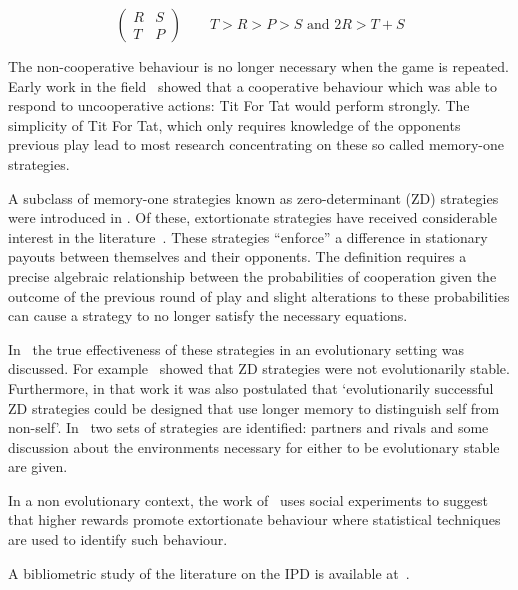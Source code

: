 \documentclass[a4paper]{article}
\begin{document}
\begin{equation}
    \begin{pmatrix}
        R & S \\
        T & P
    \end{pmatrix}
    \qquad
    T > R > P > S\text{ and }2 R > T + S
    \label{eqn:theipd}
\end{equation}


The non-cooperative behaviour is no longer necessary when the game is repeated.
Early work in the field~\cite{Axelrod1980, Axelrod1980a} showed that a cooperative behaviour
which was able to respond to uncooperative actions: Tit For Tat would perform
strongly. The simplicity of Tit For Tat, which only requires knowledge of the
opponents previous play lead to most research concentrating on these so called
memory-one strategies.

A subclass of memory-one strategies known as zero-determinant (ZD) strategies 
were introduced in \cite{Press2012}. Of these, extortionate strategies have received
considerable interest in the literature~\cite{hilbe2015partners}. These
strategies ``enforce'' a difference in stationary payouts between themselves and
their opponents. The definition requires a precise algebraic relationship
between the probabilities of cooperation given the outcome of the previous round
of play and slight alterations to these probabilities can cause a strategy to no
longer satisfy the necessary equations.

In~\cite{adami2013evolutionary, hilbe2018partners, Hilbe2013, hilbe2013adaptive,
hilbe2015partners, ichinose2018zero, Moran1707} the true effectiveness of these
strategies in an evolutionary setting was discussed. For
example~\cite{adami2013evolutionary} showed that ZD strategies were not
evolutionarily stable. Furthermore, in that work it was also postulated that
`evolutionarily successful ZD strategies could be designed that use longer
memory to distinguish self from non-self'.  In~\cite{hilbe2018partners} two sets
of strategies are identified: partners and rivals and some discussion about the
environments necessary for either to be evolutionary stable are given.

In a non
evolutionary context, the work of~\cite{becks2019extortion} uses social
experiments to suggest that higher rewards promote extortionate
behaviour where statistical techniques are used to identify such behaviour.

A bibliometric study of the literature on the IPD is available
at~\cite{glynatsi2021bibliometric}.
\end{document}
